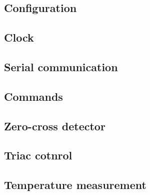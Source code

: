 \subsection{Configuration}
\subsection{Clock}
\subsection{Serial communication}
\subsection{Commands}
\subsection{Zero-cross detector}
\subsection{Triac cotnrol}
\subsection{Temperature measurement}
